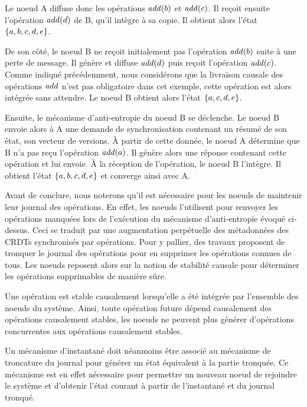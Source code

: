 Le noeud A diffuse donc les opérations $\mathit{add}(b)$ et $\mathit{add}(c)$.
Il reçoit ensuite l'opération $\mathit{add}(d)$ de B, qu'il intègre à sa copie.
Il obtient alors l'état $\left\{a,b,c,d,e\right\}$.

De son côté, le noeud B ne reçoit initialement pas l'opération $\mathit{add}(b)$ suite à une perte de message.
Il génère et diffuse $\mathit{add}(d)$ puis reçoit l'opération $\mathit{add}(c)$.
Comme indiqué précédemment, nous considérons que la livraison causale des opérations $\mathit{add}$ n'est pas obligatoire dans cet exemple, cette opération est alors intégrée sans attendre.
Le noeud B obtient alors l'état $\left\{a,c,d,e\right\}$.

Ensuite, le mécanisme d'anti-entropie du noeud B se déclenche.
Le noeud B envoie alors à A une demande de synchronisation contenant un résumé de son état, \eg son vecteur de versions.
À partir de cette donnée, le noeud A détermine que B n'a pas reçu l'opération $\mathit{add}(a)$.
Il génère alors une réponse contenant cette opération et lui envoie.
À la réception de l'opération, le noeud B l'intègre.
Il obtient l'état $\left\{a,b,c,d,e\right\}$ et converge ainsi avec A.

Avant de conclure, nous noterons qu'il est nécessaire pour les noeuds de maintenir leur journal des opérations.
En effet, les noeuds l'utilisent pour renvoyer les opérations manquées lors de l'exécution du mécanisme d'anti-entropie évoqué ci-dessus.
Ceci se traduit par une augmentation perpétuelle des métadonnées des \acp{CRDT} synchronisés par opérations.
Pour y pallier, des travaux \cite{baquero2017pure, 2021-improving-reactivity-pure-op-based-crdts-bauwens} proposent de tronquer le journal des opérations pour en supprimer les opérations connues de tous.
Les noeuds reposent alors sur la notion de stabilité causale \cite{10.1007/978-3-662-43352-2_11} pour déterminer les opérations supprimables de manière sûre.

\begin{definition}
  Une opération est stable causalement lorsqu'elle a été intégrée par l'ensemble des noeuds du système.
  Ainsi, toute opération future dépend causalement des opérations causalement stables, \ie les noeuds ne peuvent plus générer d'opérations concurrentes aux opérations causalement stables.
\end{definition}

Un mécanisme d'instantané  doit néanmoins être associé au mécanisme de troncature du journal pour générer un état équivalent à la partie tronquée.
Ce mécanisme est en effet nécessaire pour permettre un nouveau noeud de rejoindre le système et d'obtenir l'état courant à partir de l'instantané et du journal tronqué.


